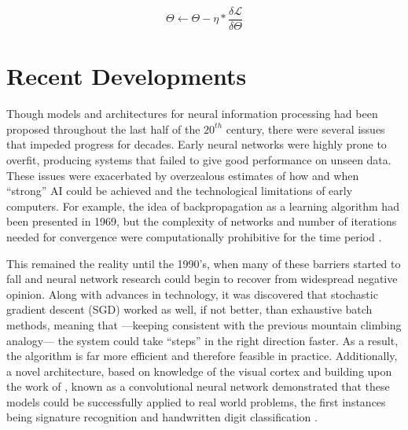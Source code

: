 \begin{equation}
\label{eq:updaterule}
\Theta \leftarrow \Theta - \eta * \frac{ \delta \mathcal{L}}{\delta \Theta}
\end{equation}


\section{Recent Developments}
\label{sec:example}

Though models and architectures for neural information processing had been proposed throughout the last half of the $20^{th}$ century, there were several issues that impeded progress for decades.
Early neural networks were highly prone to overfit, producing systems that failed to give good performance on unseen data.
These issues were exacerbated by overzealous estimates of how and when ``strong'' AI could be achieved and the technological limitations of early computers.
For example, the idea of backpropagation as a learning algorithm had been presented in 1969, but the complexity of networks and number of iterations needed for convergence were computationally prohibitive for the time period \cite{}.

This remained the reality until the 1990's, when many of these barriers started to fall and neural network research could begin to recover from widespread negative opinion.
Along with advances in technology, it was discovered that stochastic gradient descent (SGD) worked as well, if not better, than exhaustive batch methods, meaning that ---keeping consistent with the previous mountain climbing analogy--- the system could take ``steps'' in the right direction faster.
As a result, the algorithm is far more efficient and therefore feasible in practice.
Additionally, a novel architecture, based on knowledge of the visual cortex and building upon the work of \cite{Fukushima1988}, known as a convolutional neural network demonstrated that these models could be successfully applied to real world problems, the first instances being signature recognition \cite{LeCun1994} and handwritten digit classification \cite{LeCun1998}.

